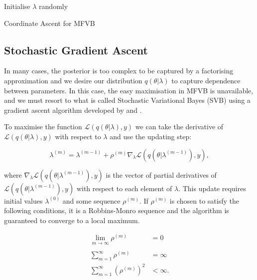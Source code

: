 \documentclass{article}\usepackage[]{graphicx}\usepackage[]{color}
\numberwithin{equation}{section}
\begin{document}
\vspace{2mm}

\begin{algorithm}[H]
 Initialise $\lambda$ randomly\;
 \caption{Coordinate Ascent for MFVB}
  \label{alg:algorithm1}
\end{algorithm}

\subsection{Stochastic Gradient Ascent}

In many cases, the posterior is too complex to be captured by a factorising approximation and we desire our distribution $q(\theta | \lambda)$ to capture dependence between parameters. In this case, the easy maximisation in MFVB is unavailable, and we must resort to what is called Stochastic Variational Bayes (SVB) using a gradient ascent algorithm developed by \citet{Paisley2012} and \citet{Hoffman2013}.

To maximise the function $\mathcal{L}(q(\theta | \lambda), y)$ we can take the derivative of $\mathcal{L}(q(\theta | \lambda), y)$ with respect to $\lambda$ and use the updating step:

\begin{equation}
\label{SGA1}
\lambda^{(m)} = \lambda^{(m-1)} + \rho^{(m)} \nabla_{\lambda} \mathcal{L}(q(\theta | \lambda^{(m-1)}), y),
\end{equation}

where $\nabla_{\lambda}\mathcal{L}(q(\theta | \lambda^{(m-1)}), y)$ is the vector of partial derivatives of $\mathcal{L}(q(\theta | \lambda^{(m-1)}), y)$ with respect to each element of $\lambda$. This update requires initial values $\lambda^{(0)}$ and some sequence $\rho^{(m)}$. If $\rho^{(m)}$ is chosen to satisfy the following conditions, it is a Robbins-Monro sequence and the algorithm is guaranteed to converge to a local maximum.

\begin{align}
\lim_{m \xrightarrow[]{} \infty} \rho^{(m)} &= 0 \nonumber \\
\sum_{m=1}^{\infty} \rho^{(m)} &=  \infty \nonumber \\
\sum_{m=1}^{\infty} (\rho^{(m)})^2 &<  \infty. \nonumber
\end{align}
\end{document}
